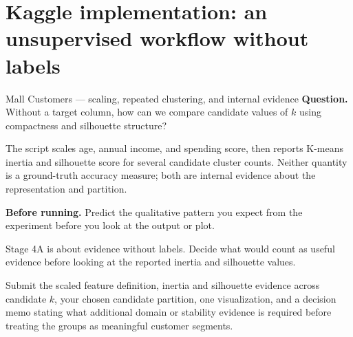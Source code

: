 \section{Kaggle implementation: an unsupervised workflow without labels}
\label{sec:kaggle-mall-unsupervised}

\begin{kaggleproject}{Mall Customers --- scaling, repeated clustering, and internal evidence}
\textbf{Question.} Without a target column, how can we compare candidate values of $k$ using compactness and silhouette structure?
\end{kaggleproject}

The script scales age, annual income, and spending score, then reports K-means inertia and silhouette score for several candidate cluster counts. Neither quantity is a ground-truth accuracy measure; both are internal evidence about the representation and partition.

\textbf{Before running.} Predict the qualitative pattern you expect from the experiment before you look at the output or plot.

\begin{labmode}
Stage 4A is about evidence without labels. Decide what would count as useful evidence before looking at the reported inertia and silhouette values.
\end{labmode}




\begin{labdeliverable}
Submit the scaled feature definition, inertia and silhouette evidence across candidate $k$, your chosen candidate partition, one visualization, and a decision memo stating what additional domain or stability evidence is required before treating the groups as meaningful customer segments.
\end{labdeliverable}
